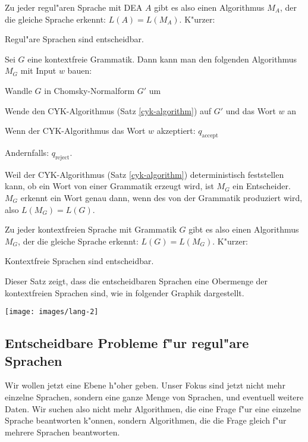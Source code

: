 Zu jeder regul"aren Sprache mit DEA $A$ gibt es also einen
Algorithmus $M_A$, der die gleiche Sprache erkennt: $L(A)=L(M_A)$.
K"urzer:

\begin{satz}
\label{regulaer-entscheidbar}
Regul"are Sprachen sind entscheidbar.
\end{satz}

\begin{beispiel}
Sei $G$ eine kontextfreie Grammatik. Dann kann man den folgenden Algorithmus
$M_G$ mit Input $w$ bauen:
\begin{compactenum}
\item Wandle $G$ in Chomsky-Normalform $G'$ um
\item Wende den CYK-Algorithmus (Satz \ref{cyk-algorithm}) auf $G'$ und das
Wort $w$ an
\item Wenn der CYK-Algorithmus das Wort $w$ akzeptiert: $q_{\text{accept}}$
\item Andernfalls: $q_{\text{reject}}$.
\end{compactenum}
Weil der CYK-Algorithmus (Satz \ref{cyk-algorithm}) deterministisch 
feststellen kann, ob ein Wort von einer Grammatik erzeugt wird, ist
$M_G$ ein Entscheider. $M_G$ erkennt ein Wort genau dann, wenn des von
der Grammatik produziert wird, also $L(M_G)=L(G)$.
\end{beispiel}

Zu jeder kontextfreien Sprache mit Grammatik $G$ gibt es also einen 
Algorithmus $M_G$, der die gleiche Sprache erkennt: $L(G)=L(M_G)$.
K"urzer:

\begin{satz}
Kontextfreie Sprachen sind entscheidbar.
\end{satz}
Dieser Satz zeigt, dass die entscheidbaren Sprachen eine 
Obermenge der kontextfreien Sprachen sind, wie in folgender
Graphik dargestellt.
\begin{center}
\texttt{[image: images/lang-2]}
\end{center}

\subsection{Entscheidbare Probleme f"ur regul"are Sprachen}
Wir wollen jetzt eine Ebene h"oher geben. Unser Fokus sind jetzt nicht
mehr einzelne Sprachen, sondern eine ganze Menge von Sprachen, und eventuell
weitere Daten. Wir suchen also nicht mehr Algorithmen, die eine Frage
f"ur eine einzelne Sprache beantworten k"onnen, sondern Algorithmen, die
die Frage gleich f"ur mehrere Sprachen beantworten.

